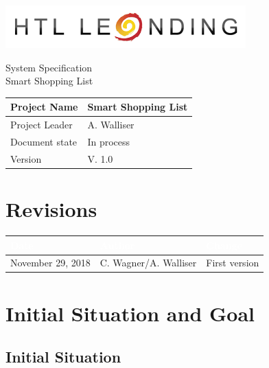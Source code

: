 \documentclass[12pt]{article}
\theoremstyle{definition}
\newcommand{\projectname}{Smart Shopping List}
\newcommand{\productname}{Smart Shopping List}
\newcommand{\projectleader}{A. Walliser}
\newcommand{\documentstatus}{In process}
\newcommand{\version}{V. 1.0}
\begin{document}
\begin{titlepage}
\begin{flushright}
\includegraphics[scale=.5]{htlleondinglogo.png}\\
\end{flushright}

\vspace{10em}

\begin{center}
{\Huge System Specification} \\[3em]
{\LARGE \productname} \\[3em]
\end{center}

\begin{flushleft}
\begin{tabular}{|l|l|}
\hline
Project Name & \projectname \\ \hline
Project Leader & \projectleader \\ \hline
Document state & \documentstatus \\ \hline
Version & \version \\ \hline
\end{tabular}
\end{flushleft}

\end{titlepage}
\section*{Revisions}
\begin{tabular}{|l|l|l|}
\hline
\cellcolor[gray]{0.5}\textcolor{white}{Date} & \cellcolor[gray]{0.5}\textcolor{white}{Author} & \cellcolor[gray]{0.5}\textcolor{white}{Change} \\ \hline
November 29, 2018&C. Wagner/A. Walliser&First version \\ \hline
\end{tabular}
\pagebreak

\tableofcontents
\pagebreak

\section{Initial Situation and Goal}

\subsection{Initial Situation}
\end{document}
